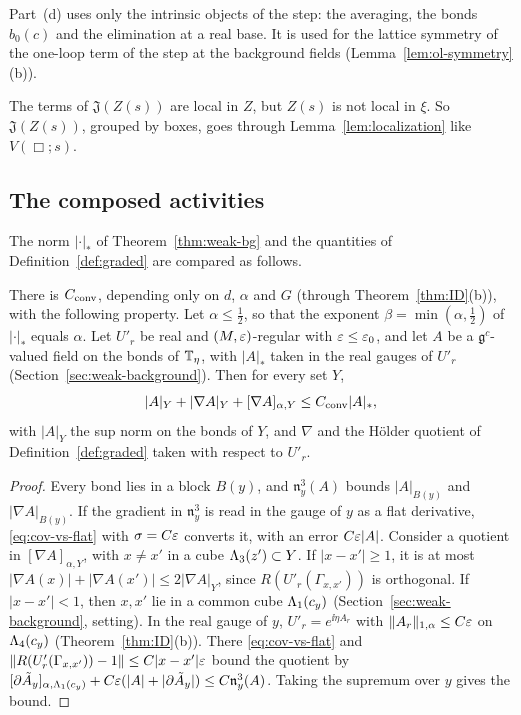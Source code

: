 Part~(d) uses only the intrinsic objects of the step: the averaging, the bonds $b_0(c)$ and the elimination at a real base. It is used for the lattice symmetry of the one-loop term of the step at the background fields (Lemma~\ref{lem:ol-symmetry}(b)).

The terms of $\mathfrak J(Z(s))$ are local in $Z$, but $Z(s)$ is not local in $\xi$. So $\mathfrak J(Z(s))$, grouped by boxes, goes through Lemma~\ref{lem:localization} like $V(\Box;s)$.

\subsection{The composed activities}\label{subsec:sq-composed}

The norm $|\cdot|_*$ of Theorem~\ref{thm:weak-bg} and the quantities of Definition~\ref{def:graded} are compared as follows.

\begin{lemma}\label{lem:norm-conversion}
There is $C_{\rm conv}$, depending only on $d$, $\alpha$ and $G$ (through Theorem~\ref{thm:ID}(b)), with the following property. Let $\alpha\le\frac12$, so that the exponent $\beta=\min(\alpha,\frac12)$ of $|\cdot|_*$ equals $\alpha$. Let $U'_r$ be real and $(M,\varepsilon)$-regular with $\varepsilon\le\varepsilon_0$, and let $A$ be a $\mathfrak g^c$-valued field on the bonds of $\mathbb T_\eta$, with $|A|_*$ taken in the real gauges of $U'_r$ (Section~\ref{sec:weak-background}). Then for every set $Y$,
\[
|A|_Y+|\nabla A|_Y+[\nabla A]_{\alpha,Y}\le C_{\rm conv}|A|_*,
\]
with $|A|_Y$ the sup norm on the bonds of $Y$, and $\nabla$ and the H\"older quotient of Definition~\ref{def:graded} taken with respect to $U'_r$.
\end{lemma}

\begin{proof}
Every bond lies in a block $B(y)$, and $\mathfrak n^3_y(A)$ bounds $|A|_{B(y)}$ and $|\nabla A|_{B(y)}$. If the gradient in $\mathfrak n^3_y$ is read in the gauge of $y$ as a flat derivative, \eqref{eq:cov-vs-flat} with $\sigma=C\varepsilon$ converts it, with an error $C\varepsilon|A|$. Consider a quotient in $[\nabla A]_{\alpha,Y}$, with $x\ne x'$ in a cube $\Lambda_3(z')\subset Y$. If $|x-x'|\ge1$, it is at most $|\nabla A(x)|+|\nabla A(x')|\le2|\nabla A|_Y$, since $R(U'_r(\Gamma_{x,x'}))$ is orthogonal. If $|x-x'|<1$, then $x,x'$ lie in a common cube $\Lambda_1(c_y)$ (Section~\ref{sec:weak-background}, setting). In the real gauge of $y$, $U'_r=e^{\ii\eta A_r}$ with $\|A_r\|_{1,\alpha}\le C\varepsilon$ on $\Lambda_4(c_y)$ (Theorem~\ref{thm:ID}(b)). There \eqref{eq:cov-vs-flat} and $\|R(U'_r(\Gamma_{x,x'}))-1\|\le C|x-x'|\varepsilon$ bound the quotient by $[\partial\tilde A_y]_{\alpha,\Lambda_1(c_y)}+C\varepsilon(|A|+|\partial\tilde A_y|)\le C\mathfrak n^3_y(A)$. Taking the supremum over $y$ gives the bound.
\end{proof}


